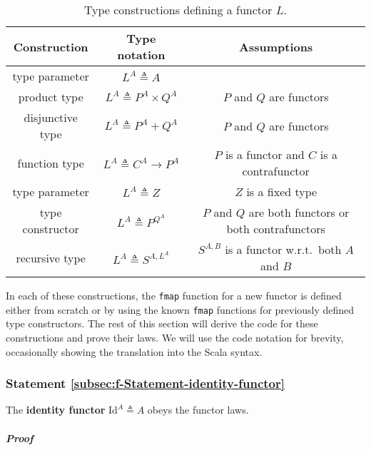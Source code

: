 \begin{table}
\begin{centering}
\begin{tabular}{|c|c|c|}
\hline 
\textbf{\small{}Construction} & \textbf{\small{}Type notation} & \textbf{\small{}Assumptions}\tabularnewline
\hline 
\hline 
{\footnotesize{}type parameter} & {\footnotesize{}$L^{A}\triangleq A$} & \tabularnewline
\hline 
{\footnotesize{}product type} & {\footnotesize{}$L^{A}\triangleq P^{A}\times Q^{A}$} & {\footnotesize{}$P$ and $Q$ are functors}\tabularnewline
\hline 
{\footnotesize{}disjunctive type} & {\footnotesize{}$L^{A}\triangleq P^{A}+Q^{A}$} & {\footnotesize{}$P$ and $Q$ are functors}\tabularnewline
\hline 
{\footnotesize{}function type} & {\footnotesize{}$L^{A}\triangleq C^{A}\rightarrow P^{A}$} & {\footnotesize{}$P$ is a functor and $C$ is a contrafunctor}\tabularnewline
\hline 
{\footnotesize{}type parameter} & {\footnotesize{}$L^{A}\triangleq Z$} & {\footnotesize{}$Z$ is a fixed type}\tabularnewline
\hline 
{\footnotesize{}type constructor} & {\footnotesize{}$L^{A}\triangleq P^{Q^{A}}$} & {\footnotesize{}$P$ and $Q$ are both functors or both contrafunctors}\tabularnewline
\hline 
{\footnotesize{}recursive type} & {\footnotesize{}$L^{A}\triangleq S^{A,L^{A}}$} & {\footnotesize{}$S^{A,B}$ is a functor w.r.t.~both $A$ and $B$}\tabularnewline
\hline 
\end{tabular}
\par\end{centering}
\caption{Type constructions defining a functor $L$.\label{tab:f-Functor-constructions}}
\end{table}

In each of these constructions, the \lstinline!fmap! function for
a new functor is defined either from scratch or by using the known
\lstinline!fmap! functions for previously defined type constructors.
The rest of this section will derive the code for these constructions
and prove their laws. We will use the code notation for brevity, occasionally
showing the translation into the Scala syntax.

\subsubsection{Statement \label{subsec:f-Statement-identity-functor}\ref{subsec:f-Statement-identity-functor}}

The \textbf{identity functor} $\text{Id}^{A}\triangleq A$
obeys the functor laws.

\subparagraph{Proof}

